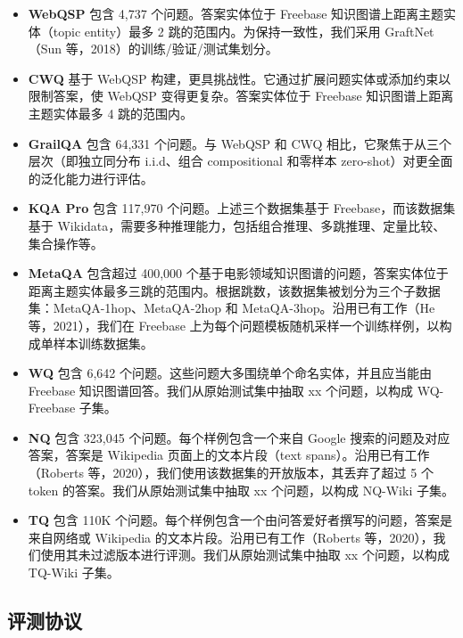 \documentclass[11pt,UTF8,fontset=fandol]{ctexart}
\begin{document}
\begin{itemize}[leftmargin=1.5em]
\item \textbf{WebQSP} 包含 4{,}737 个问题。答案实体位于 Freebase 知识图谱上距离主题实体（topic entity）最多 2 跳的范围内。为保持一致性，我们采用 GraftNet（Sun 等，2018）的训练/验证/测试集划分。

\item \textbf{CWQ} 基于 WebQSP 构建，更具挑战性。它通过扩展问题实体或添加约束以限制答案，使 WebQSP 变得更复杂。答案实体位于 Freebase 知识图谱上距离主题实体最多 4 跳的范围内。

\item \textbf{GrailQA} 包含 64{,}331 个问题。与 WebQSP 和 CWQ 相比，它聚焦于从三个层次（即独立同分布 i.i.d、组合 compositional 和零样本 zero-shot）对更全面的泛化能力进行评估。

\item \textbf{KQA Pro} 包含 117{,}970 个问题。上述三个数据集基于 Freebase，而该数据集基于 Wikidata，需要多种推理能力，包括组合推理、多跳推理、定量比较、集合操作等。

\item \textbf{MetaQA} 包含超过 400{,}000 个基于电影领域知识图谱的问题，答案实体位于距离主题实体最多三跳的范围内。根据跳数，该数据集被划分为三个子数据集：MetaQA-1hop、MetaQA-2hop 和 MetaQA-3hop。沿用已有工作（He 等，2021），我们在 Freebase 上为每个问题模板随机采样一个训练样例，以构成单样本训练数据集。

\item \textbf{WQ} 包含 6{,}642 个问题。这些问题大多围绕单个命名实体，并且应当能由 Freebase 知识图谱回答。我们从原始测试集中抽取 xx 个问题，以构成 WQ-Freebase 子集。

\item \textbf{NQ} 包含 323{,}045 个问题。每个样例包含一个来自 Google 搜索的问题及对应答案，答案是 Wikipedia 页面上的文本片段（text spans）。沿用已有工作（Roberts 等，2020），我们使用该数据集的开放版本，其丢弃了超过 5 个 token 的答案。我们从原始测试集中抽取 xx 个问题，以构成 NQ-Wiki 子集。

\item \textbf{TQ} 包含 110K 个问题。每个样例包含一个由问答爱好者撰写的问题，答案是来自网络或 Wikipedia 的文本片段。沿用已有工作（Roberts 等，2020），我们使用其未过滤版本进行评测。我们从原始测试集中抽取 xx 个问题，以构成 TQ-Wiki 子集。
\end{itemize}

\subsection{评测协议}
\end{document}
